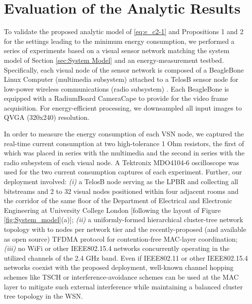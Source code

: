 \documentclass[twocolumn,english]{IEEEtran}
\theoremstyle{plain}
\theoremstyle{definition}
\begin{document}
\section{Evaluation of the Analytic Results\label{sec:Evaluation-of-Energy} }

To validate the proposed analytic model of \eqref{eq:e_c2-1} and
Propositions 1 and 2 for the settings leading to the minimum energy
consumption, we performed a series of experiments based on a visual
sensor network matching the system model of Section \ref{sec:System Model}
and an energy-measurement testbed. Specifically, each visual node
of the sensor network is composed of a BeagleBone Linux Computer (multimedia
subsystem) attached to a TelosB sensor node for low-power wireless
communications (radio subsystem) \cite{CancliniSENSYS2013}. Each
BeagleBone is equipped with a RadiumBoard CameraCape to provide for
the video frame acquisition. For energy-efficient processing, we downsampled
all input images to QVGA (320x240) resolution. 

In order to measure the energy consumption of each VSN node, we captured
the real-time current consumption at two high-tolerance 1 Ohm resistors,
the first of which was placed in series with the multimedia and the
second in series with the radio subsystem of each visual node. A Tektronix
MDO4104-6 oscilloscope was used for the two current consumption captures
of each experiment. Further, our deployment involved: \emph{(i)} a
TelosB node serving as the LPBR and collecting all bitstreams and
2 to 32 visual nodes positioned within four adjacent rooms and the
corridor of the same floor of the Department of Electrical and Electronic
Engineering at University College London {[}following the layout of
Figure \ref{fig:System_model}(a){]}; \emph{(ii)} a uniformly-formed
hierarchical cluster-tree network topology with  to 
nodes per network tier and the recently-proposed (and available as
open source) TFDMA protocol \cite{burana2012DTFDMA} for contention-free
MAC-layer coordination; \emph{(iii)} no WiFi or other IEEE802.15.4
networks concurrently operating in the utilized channels of the 2.4
GHz band. Even if IEEE802.11 or other IEEE802.15.4 networks coexist
with the proposed deployment, well-known channel hopping schemes like
TSCH \cite{6185525} or interference-avoidance schemes \cite{5672592}
can be used at the MAC layer to mitigate such external interference
while maintaining a balanced cluster tree topology in the WSN. 
\end{document}
